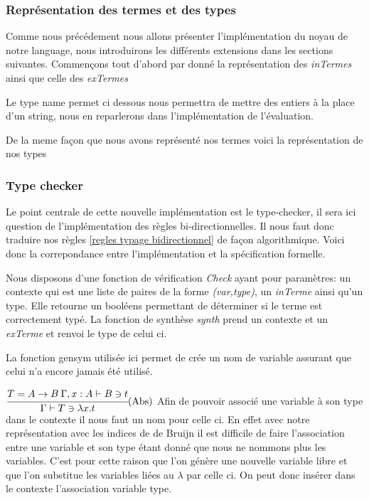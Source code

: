 \documentclass {article}
\newcommand{\codefrom}[3]
           {}
\theoremstyle{definition}
\theoremstyle{remark}
\begin{document}
\subsubsection{Représentation des termes et des types}

Comme nous précédement nous allons  
présenter l'implémentation du noyau de notre language, nous introduirons 
les différents extensions dans les sections suivantes.
Commençons tout d'abord par donné la représentation des \emph{inTermes}
ainsi que celle des \emph{exTermes}

\codefrom{typed}{lambda}{inTm}
\codefrom{typed}{lambda}{exTm}

Le type name permet ci dessous nous permettra de mettre des entiers à la place 
d'un string, nous en reparlerons dans l'implémentation de l'évaluation.
\codefrom{typed}{lambda}{name}

De la meme façon que nous avons représenté nos termes voici la 
représentation de nos types 

\codefrom{typed}{lambda}{Type}


\subsubsection{Type checker}

Le point centrale de cette nouvelle implémentation est le type-checker, 
il sera ici question de l'implémentation des règles bi-directionnelles.
Il nous faut donc traduire nos règles \ref{regles typage bidirectionnel} 
de façon algorithmique. Voici donc la correpondance entre l'implémentation et la spécification formelle.

Nous disposons d'une fonction de vérification \emph{Check} ayant pour 
paramètres: un contexte qui est une liste de paires de la forme \emph{(var,type)},
un \emph{inTerme} ainsi qu'un type. Elle retourne un booléens permettant de déterminer
si le terme est correctement typé.
La fonction de synthèse \emph{synth} prend un contexte et un \emph{exTerme} 
et renvoi le type de celui ci.

La fonction gensym utilisée ici permet de crée un nom de variable assurant que celui n'a encore jamais
été utilisé. 

\label{check}

\codefrom{typed}{lambda}{check_abs}
$\cfrac{T = A \rightarrow B \: \Gamma, x:A \vdash B \ni t}
         {\Gamma \vdash T \ni \lambda x. t}\mbox{(Abs)}$
Afin de pouvoir associé une variable à son type dans le contexte il nous faut un nom pour celle ci.
En effet avec notre représentation avec les indices de de Bruijn il est difficile de faire l'association entre 
une variable et son type étant donné que nous ne nommons plus les variables.
C'est pour cette raison que l'on génère une nouvelle variable libre et que l'on substitue les variables liées 
au $\lambda$ par celle ci. On peut donc insérer dans le contexte l'association variable type.
  
\end{document}

